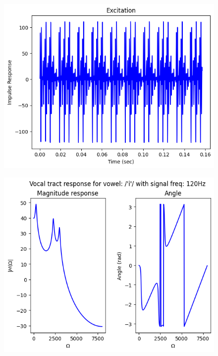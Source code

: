 \documentclass{article}
\begin{document}
\begin{figure}[H]
\begin{center}
\includegraphics[scale = 0.5]{Q4_A2R.png}
\end{center}
\end{figure}


\begin{figure}[H]
\begin{center}
\includegraphics[scale = 0.5]{Q4_B1.png}
\end{center}
\end{figure}
\end{document}
